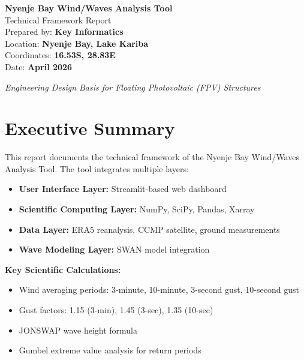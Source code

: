 \documentclass[12pt]{article}
\begin{document}
\begin{titlepage}
    \centering
    \vspace*{2cm}
    
    {\huge\bfseries\color{primary} Nyenje Bay Wind/Waves Analysis Tool}\\[0.5cm]
    {\Large Technical Framework Report}\\[2cm]
    
    {\large Prepared by: \textbf{Key Informatics}}\\[0.3cm]
    {\large Location: \textbf{Nyenje Bay, Lake Kariba}}\\[0.3cm]
    {\large Coordinates: \textbf{16.53S, 28.83E}}\\[0.3cm]
    {\large Date: \textbf{April 2026}}\\[2cm]
    
    \vfill
    
    {\large \textit{Engineering Design Basis for Floating Photovoltaic (FPV) Structures}}
\end{titlepage}

\tableofcontents
\newpage

\section*{Executive Summary}

This report documents the technical framework of the Nyenje Bay Wind/Waves Analysis Tool. The tool integrates multiple layers:
\begin{itemize}
    \item \textbf{User Interface Layer:} Streamlit-based web dashboard
    \item \textbf{Scientific Computing Layer:} NumPy, SciPy, Pandas, Xarray
    \item \textbf{Data Layer:} ERA5 reanalysis, CCMP satellite, ground measurements
    \item \textbf{Wave Modeling Layer:} SWAN model integration
\end{itemize}

\vspace{0.5cm}

\textbf{Key Scientific Calculations:}
\begin{itemize}
    \item Wind averaging periods: 3-minute, 10-minute, 3-second gust, 10-second gust
    \item Gust factors: 1.15 (3-min), 1.45 (3-sec), 1.35 (10-sec)
    \item JONSWAP wave height formula
    \item Gumbel extreme value analysis for return periods
\end{itemize}
\end{document}
